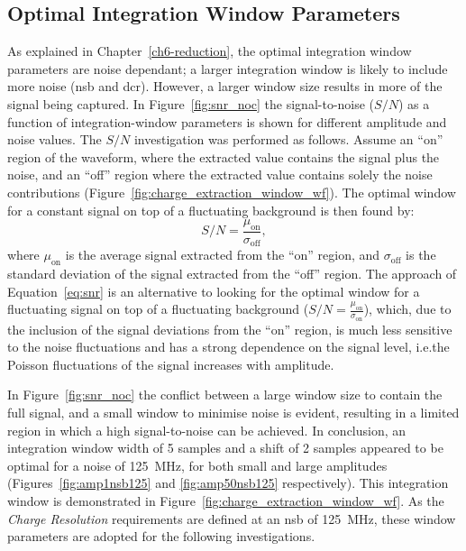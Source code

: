 \subsection{Optimal Integration Window Parameters}

As explained in Chapter~\ref{ch6-reduction}, the optimal integration window parameters are noise dependant; a larger integration window is likely to include more noise (\gls{nsb} and \gls{dcr}). However, a larger window size results in more of the signal being captured. In Figure~\ref{fig:snr_noc} the signal-to-noise ($S/N$) as a function of integration-window parameters is shown for different amplitude and noise values. The $S/N$ investigation was performed as follows. Assume an ``on'' region of the waveform, where the extracted value contains the signal plus the noise, and an ``off'' region where the extracted value contains solely the noise contributions (Figure~\ref{fig:charge_extraction_window_wf}). The optimal window for a constant signal on top of a fluctuating background is then found by:
\begin{equation} \label{eq:snr}
S/N = \frac{\mu_\text{on}}{\sigma_\text{off}},
\end{equation}
where $\mu_\text{on}$ is the average signal extracted from the ``on'' region, and $\sigma_\text{off}$ is the standard deviation of the signal extracted from the ``off'' region. The approach of Equation~\ref{eq:snr} is an alternative to looking for the optimal window for a fluctuating signal on top of a fluctuating background ($S/N = \frac{\mu_\text{on}}{\sigma_\text{on}}$), which, due to the inclusion of the signal deviations from the ``on'' region, is much less sensitive to the noise fluctuations and has a strong dependence on the signal level, i.e.\@ the Poisson fluctuations of the signal increases with amplitude.

In Figure~\ref{fig:snr_noc} the conflict between a large window size to contain the full signal, and a small window to minimise noise is evident, resulting in a limited region in which a high signal-to-noise can be achieved. In conclusion, an integration window width of 5 samples and a shift of 2 samples appeared to be optimal for a noise of \SI{125}{MHz}, for both small and large amplitudes (Figures~\ref{fig:amp1nsb125} and \ref{fig:amp50nsb125} respectively). This integration window is demonstrated in Figure~\ref{fig:charge_extraction_window_wf}. As the \textit{Charge Resolution} requirements are defined at an \gls{nsb} of \SI{125}{MHz}, these window parameters are adopted for the following investigations.

